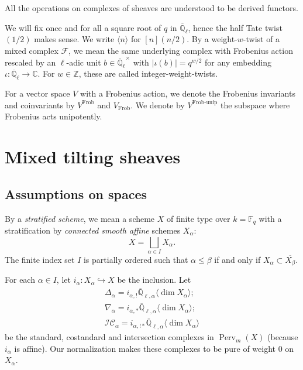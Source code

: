 \documentclass{amsart}
\theoremstyle{plain}
\theoremstyle{definition}
\theoremstyle{remark}
\numberwithin{equation}{subsection}
\begin{document}
All the operations on complexes of sheaves are understood to be derived functors.

We will fix once and for all a square root of $q$ in ${\overline{\mathbb{Q}}_{\ell}}$, hence the half Tate twist $(1/2)$ makes sense. We write ${\langle{{n}}\rangle}$ for $[n](n/2)$. By a weight-$w$-twist of a mixed complex ${\mathcal{F}}$, we mean the same underlying complex with Frobenius action rescaled by an $\ell$-adic unit $b\in{\overline{\mathbb{Q}}_{\ell}}^{\times}$ with $|\iota(b)|=q^{w/2}$ for any embedding $\iota:{\overline{\mathbb{Q}}_{\ell}}\to{\mathbb{C}}$. For $w\in{\mathbb{Z}}$, these are called integer-weight-twists.

For a vector space $V$ with a Frobenius action, we denote the Frobenius invariants and coinvariants by $V^\operatorname{Frob}$ and $V_\operatorname{Frob}$. We denote by $V^\operatorname{Frob-unip}$ the subspace where Frobenius acts unipotently.
 

\section{Mixed tilting sheaves}\label{s:mt}

\subsection{Assumptions on spaces}\label{ss:ass} By a {\em stratified scheme}, we mean a scheme $X$ of finite type over $k={\mathbb{F}}_q$ with a stratification by {\em connected smooth affine} schemes $X_\alpha$:
\begin{equation*}
X=\bigsqcup_{\alpha\in I}X_\alpha.
\end{equation*}
The finite index set $I$ is partially ordered such that $\alpha\leq\beta$ if and only if $X_\alpha\subset\overline{X_\beta}$.

For each $\alpha\in I$, let $i_\alpha:X_\alpha\hookrightarrow X$ be the inclusion. Let
\begin{eqnarray*}
\Delta_\alpha=i_{\alpha,!}{\overline{\mathbb{Q}}_{\ell,\alpha}{\langle{{\dim X_\alpha}}\rangle}};\\
\nabla_\alpha=i_{\alpha,*}{\overline{\mathbb{Q}}_{\ell,\alpha}{\langle{{\dim X_\alpha}}\rangle}};\\
{\mathcal{IC}}_\alpha=i_{\alpha,!*}{\overline{\mathbb{Q}}_{\ell,\alpha}{\langle{{\dim X_\alpha}}\rangle}}
\end{eqnarray*}
be the standard, costandard and intersection complexes in ${\operatorname{Perv}_m({X})}$ (because $i_\alpha$ is affine). Our normalization makes these complexes to be pure of weight 0 on $X_\alpha$.
\end{document}
